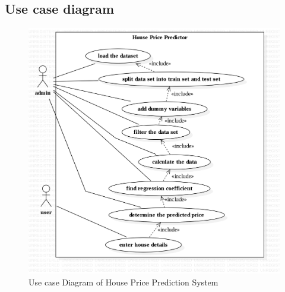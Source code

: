 \subsection{Use case diagram}
\newpage 
\begin{figure}
	\includegraphics[width=6in]{UseCaseDiagram1.png} 
	\caption{Use case Diagram of House Price Prediction System} %
	\label{Use case Diagram of House Price Prediction System} %
\end{figure}
\newpage

